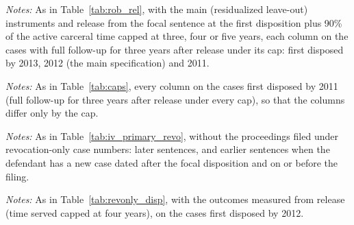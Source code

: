 \documentclass[11pt]{article}
\newcommand{\tabnote}[1]{\par\vspace{0.6ex}\begin{minipage}{\linewidth}\linespread{1}\footnotesize\textit{Notes:} #1\end{minipage}}
\begin{document}
\begin{table}[H]
\centering
\caption{2SLS from release with time served capped at three, four and five years}\label{tab:caps}
{\small\linespread{1}\selectfont\renewcommand{\arraystretch}{0.9}\resizebox{\textwidth}{!}{}}
\tabnote{As in Table~\ref{tab:rob_rel}, with the main (residualized leave-out) instruments and release from the focal sentence at the first disposition plus 90\% of the active carceral time capped at three, four or five years, each column on the cases with full follow-up for three years after release under its cap: first disposed by 2013, 2012 (the main specification) and 2011.}
\end{table}

\begin{table}[H]
\centering
\caption{2SLS from release with time served capped at three, four and five years, on the same cases}\label{tab:caps_same}
{\small\linespread{1}\selectfont\renewcommand{\arraystretch}{0.9}\resizebox{\textwidth}{!}{}}
\tabnote{As in Table~\ref{tab:caps}, every column on the cases first disposed by 2011 (full follow-up for three years after release under every cap), so that the columns differ only by the cap.}
\end{table}

\begin{table}[H]
\centering
\caption{2SLS from the disposition: revocations of other sentences without revocation-only case numbers}\label{tab:revonly_disp}
{\small\linespread{1}\selectfont\renewcommand{\arraystretch}{0.9}}
\tabnote{As in Table~\ref{tab:iv_primary_revo}, without the proceedings filed under revocation-only case numbers: later sentences, and earlier sentences when the defendant has a new case dated after the focal disposition and on or before the filing.}
\end{table}

\begin{table}[H]
\centering
\caption{2SLS from release: revocations of other sentences without revocation-only case numbers}\label{tab:revonly_rel}
{\small\linespread{1}\selectfont\renewcommand{\arraystretch}{0.9}}
\tabnote{As in Table~\ref{tab:revonly_disp}, with the outcomes measured from release (time served capped at four years), on the cases first disposed by 2012.}
\end{table}
\end{document}
